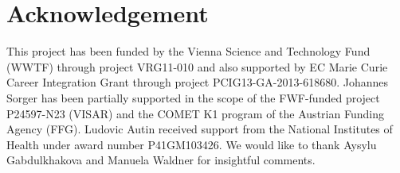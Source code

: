 \vspace{-4mm}
\section{Acknowledgement}

This project has been funded by the Vienna Science and Technology Fund (WWTF) through project VRG11-010 and also supported by EC Marie Curie Career Integration Grant through project PCIG13-GA-2013-618680. Johannes Sorger has been partially supported in the scope of the FWF-funded project P24597-N23 (VISAR) and the COMET K1 program of the Austrian Funding Agency (FFG). Ludovic Autin received support from the National Institutes of Health under award number P41GM103426. We would like to thank Aysylu Gabdulkhakova and Manuela Waldner for insightful comments.
